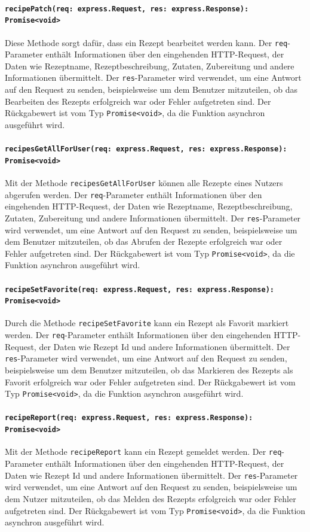 \documentclass{entwurfsheft}
\begin{document}
\paragraph{\texttt{recipePatch(req: express.Request, res: express.Response): Promise<void>}}
Diese Methode sorgt dafür, dass ein Rezept bearbeitet werden kann. Der \texttt{req}-Parameter enthält Informationen über den eingehenden HTTP-Request, der Daten wie Rezeptname, Rezeptbeschreibung, Zutaten, Zubereitung und andere Informationen übermittelt. Der \texttt{res}-Parameter wird verwendet, um eine Antwort auf den Request zu senden, beispielsweise um dem Benutzer mitzuteilen, ob das Bearbeiten des Rezepts erfolgreich war oder Fehler aufgetreten sind.
Der Rückgabewert ist vom Typ \texttt{Promise<void>}, da die Funktion asynchron ausgeführt wird.
\paragraph{\texttt{recipesGetAllForUser(req: express.Request, res: express.Response): Promise<void>}}
Mit der Methode \texttt{recipesGetAllForUser} können alle Rezepte eines Nutzers abgerufen werden. Der \texttt{req}-Parameter enthält Informationen über den eingehenden HTTP-Request, der Daten wie Rezeptname, Rezeptbeschreibung, Zutaten, Zubereitung und andere Informationen übermittelt. Der \texttt{res}-Parameter wird verwendet, um eine Antwort auf den Request zu senden, beispielsweise um dem Benutzer mitzuteilen, ob das Abrufen der Rezepte erfolgreich war oder Fehler aufgetreten sind.
Der Rückgabewert ist vom Typ \texttt{Promise<void>}, da die Funktion asynchron ausgeführt wird.
\paragraph{\texttt{recipeSetFavorite(req: express.Request, res: express.Response): Promise<void>}}
Durch die Methode \texttt{recipeSetFavorite} kann ein Rezept als Favorit markiert werden. Der \texttt{req}-Parameter enthält Informationen über den eingehenden HTTP-Request, der Daten wie Rezept Id und andere Informationen übermittelt. Der \texttt{res}-Parameter wird verwendet, um eine Antwort auf den Request zu senden, beispielsweise um dem Benutzer mitzuteilen, ob das Markieren des Rezepts als Favorit erfolgreich war oder Fehler aufgetreten sind.
Der Rückgabewert ist vom Typ \texttt{Promise<void>}, da die Funktion asynchron ausgeführt wird.
\paragraph{\texttt{recipeReport(req: express.Request, res: express.Response): Promise<void>}}
Mit der Methode \texttt{recipeReport} kann ein Rezept gemeldet werden. Der \texttt{req}-Parameter enthält Informationen über den eingehenden HTTP-Request, der Daten wie Rezept Id und andere Informationen übermittelt. Der \texttt{res}-Parameter wird verwendet, um eine Antwort auf den Request zu senden, beispielsweise um dem Nutzer mitzuteilen, ob das Melden des Rezepts erfolgreich war oder Fehler aufgetreten sind.
Der Rückgabewert ist vom Typ \texttt{Promise<void>}, da die Funktion asynchron ausgeführt wird.
\end{document}
